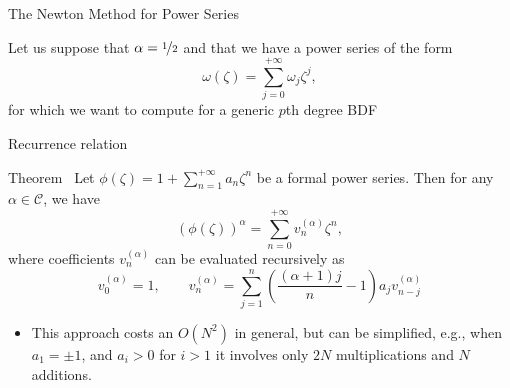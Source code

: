 \documentclass[aspectratio=169,xcolor=dvipsnames]{beamer}
\begin{document}
\begin{frame}{The Newton Method for Power Series~\parencite{HenriciFFTMethods}}

Let us suppose that $\alpha = \nicefrac{1}{2}$ and that we have a power series of the form
\[
\omega(\zeta) = \sum_{j=0}^{+\infty} \omega_j \zeta^j,
\]
for which we want to compute for a generic $p$th degree BDF

\end{frame}

\begin{frame}{Recurrence relation}

\begin{alertblock}{Theorem~\cite[Theorem 1.6c, p. 42]{HenriciBook}}
Let $\phi(\zeta) = 1 + \sum_{n=1}^{+\infty} a_n \zeta^n$ be a formal power series. Then for any $\alpha \in \mathcal{C}$, we have
\[
(\phi(\zeta))^\alpha = \sum_{n=0}^{+\infty} v_n^{(\alpha)} \zeta^n,
\]
where coefficients $v_n^{(\alpha)}$ can be evaluated recursively as
\[
 v_0^{(\alpha)} = 1, \qquad v_n^{(\alpha)} = \sum_{j=1}^{n} \left( \frac{(\alpha +1)j}{n} - 1 \right) a_j v_{n-j}^{(\alpha)}
\]
\end{alertblock}

\begin{itemize}
	\item[\faMoneyBillWave] This approach costs an $O(N^2)$ in general, but can be simplified, e.g., when $a_1 = \pm 1$, and $a_i > 0$ for $i > 1$ it involves only $2N$ multiplications and $N$ additions.
\end{itemize}

\end{frame}
\end{document}
